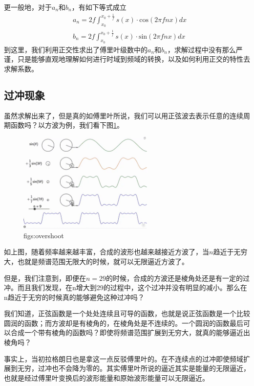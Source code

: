 \documentclass[lang=cn,11pt,a4paper,cite=numbers]{elegantpaper}
\begin{document}
  更一般地，对于$a_{n}$和$b_{n}$，有如下等式成立
\begin{equation}
  \begin{aligned}
    &a_{n}=2f\int_{x_{0}}^{x_{0}+\frac{1}{f}}s(x){\cdot}\mathrm{cos}(2{\pi}fnx)dx\\
    &b_{n}=2f\int_{x_{0}}^{x_{0}+\frac{1}{f}}s(x){\cdot}\mathrm{sin}(2{\pi}fnx)dx
  \end{aligned}
\end{equation}
到这里，我们利用正交性求出了傅里叶级数中的$a_{n}$和$b_{n}$，求解过程中没有那么严谨，只是能够直观地理解如何进行时域到频域的转换，以及如何利用正交的特性去求解系数。

\subsection{过冲现象}
  虽然求解出来了，但是真的如傅里叶所说，我们可以用正弦波去表示任意的连续周期函数吗？以方波为例，我们看下图\ref{figs:overshoot}。
\begin{figure}[!htb]
  \centering
  \includegraphics[width=0.6\textwidth]{figs/overshoot.png}
  \caption{figs:overshoot}
  \label{figs:overshoot}
\end{figure}
如上图，随着频率越来越丰富，合成的波形也越来越接近方波了，当$n$趋近于无穷大，也就是频谱范围无限大的时候，就可以无限逼近方波了。

  但是，我们注意到，即便在$n=29$的时候，合成的方波还是棱角处还是有一定的过冲。而且我们发现，在n增大到29的过程中，这个过冲并没有明显的减小。那么在n趋近于无穷的时候真的能够避免这种过冲吗？

  我们知道，正弦函数是一个处处连续且可导的函数，也就是说正弦函数是一个比较圆润的函数；而方波却是有棱角的，在棱角处是不连续的。一个圆润的函数最后可以合成一个带有棱角的函数吗？即使将频谱范围扩展到无穷大，就真的能够逼近出棱角吗？

  事实上，当初拉格朗日也是拿这一点反驳傅里叶的。在不连续点的过冲即使频域扩展到无穷，过冲也不会降为零的。其实傅里叶所说的逼近其实是能量的无限逼近，也就是经过傅里叶变换后的波形能量和原始波形能量可以无限逼近。
\end{document}
